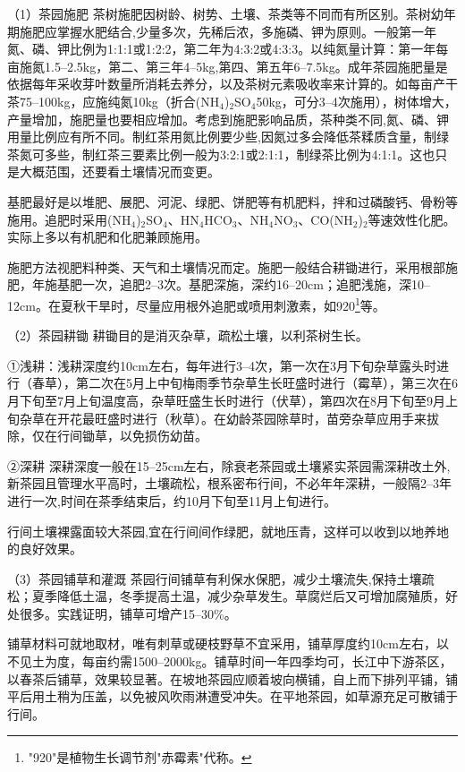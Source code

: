 \documentclass{ctexbook}
\begin{document}
（1）茶园施肥 茶树施肥因树龄、树势、土壤、茶类等不同而有所区别。茶树幼年期施肥应掌握水肥结合,少量多次，先稀后浓，多施磷、钾为原则。一般第一年氮、磷、钾比例为1:1:1或1:2:2，第二年为4:3:2或4:3:3。以纯氮量计算：第一年每亩施氮1.5--2.5kg，第二、第三年4--5kg,第四、第五年6--7.5kg。成年茶园施肥量是依据每年采收芽叶数量所消耗去养分，以及茶树元素吸收率来计算的。如每亩产干茶75--100kg，应施纯氮10kg（折合(NH$_4$)$_2$SO$_4$50kg，可分3--4次施用），树体增大，产量增加，施肥量也要相应增加。考虑到施肥影响品质，茶种类不同,氮、磷、钾用量比例应有所不同。制红茶用氮比例要少些,因氮过多会降低茶糅质含量，制绿茶氮可多些，制红茶三要素比例一般为3:2:1或2:1:1，制绿茶比例为4:1:1。这也只是大概范围，还要看土壤情况而变更。

基肥最好是以堆肥、展肥、河泥、绿肥、饼肥等有机肥料，拌和过磷酸钙、骨粉等施用。追肥时采用(NH$_4$)$_2$SO$_4$、HN$_4$HCO$_3$、NH$_4$NO$_3$、CO(NH$_2$)$_2$等速效性化肥。实际上多以有机肥和化肥兼顾施用。

施肥方法视肥料种类、天气和土壤情况而定。施肥一般结合耕锄进行，采用根部施肥，年施基肥一次，追肥2--3次。基肥深施，深约16--20cm；追肥浅施，深10--12cm。在夏秋干旱时，尽量应用根外追肥或喷用刺激素，如920\footnote{"920"是植物生长调节剂"赤霉素"代称。}等。

（2）茶园耕锄 耕锄目的是消灭杂草，疏松土壤，以利茶树生长。

①浅耕：浅耕深度约10cm左右，每年进行3--4次，第一次在3月下旬杂草露头时进行（春草），第二次在5月上中旬梅雨季节杂草生长旺盛时进行（霉草），第三次在6月下旬至7月上旬温度高，杂草旺盛生长时进行（伏草），第四次在8月下旬至9月上旬杂草在开花最旺盛时进行（秋草）。在幼龄茶园除草时，苗旁杂草应用手来拔除，仅在行间锄草，以免损伤幼苗。

②深耕 深耕深度一般在15--25cm左右，除衰老茶园或土壤紧实茶园需深耕改土外,新茶园且管理水平高时，土壤疏松，根系密布行间，不必年年深耕，一般隔2--3年进行一次,时间在茶季结束后，约10月下旬至11月上旬进行。

行间土壤裸露面较大茶园,宜在行间间作绿肥，就地压青，这样可以收到以地养地的良好效果。

（3）茶园铺草和灌溉 茶园行间铺草有利保水保肥，减少土壤流失,保持土壤疏松；夏季降低土温，冬季提高土温，减少杂草发生。草腐烂后又可增加腐殖质，好处很多。实践证明，铺草可增产15--30\%。

铺草材料可就地取材，唯有刺草或硬枝野草不宜采用，铺草厚度约10cm左右，以不见土为度，每亩约需1500--2000kg。铺草时间一年四季均可，长江中下游茶区，以春茶后铺草，效果较显著。在坡地茶园应顺着坡向横铺，自上而下排列平铺，铺平后用土稍为压盖，以免被风吹雨淋遭受冲失。在平地茶园，如草源充足可散铺于行间。
\end{document}
